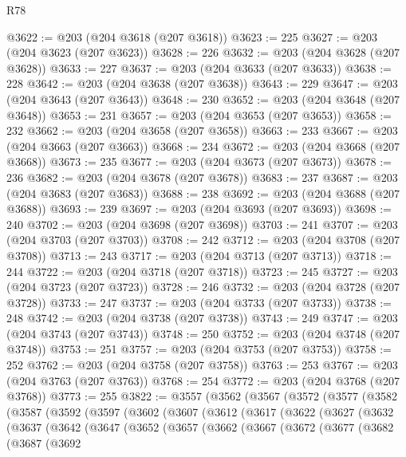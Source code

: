 \begin{lexlean}{R78}
\begin{coremodule}
@3622 := @203 (@204 @3618 (@207 @3618))
@3623 := 225
@3627 := @203 (@204 @3623 (@207 @3623))
@3628 := 226
@3632 := @203 (@204 @3628 (@207 @3628))
@3633 := 227
@3637 := @203 (@204 @3633 (@207 @3633))
@3638 := 228
@3642 := @203 (@204 @3638 (@207 @3638))
@3643 := 229
@3647 := @203 (@204 @3643 (@207 @3643))
@3648 := 230
@3652 := @203 (@204 @3648 (@207 @3648))
@3653 := 231
@3657 := @203 (@204 @3653 (@207 @3653))
@3658 := 232
@3662 := @203 (@204 @3658 (@207 @3658))
@3663 := 233
@3667 := @203 (@204 @3663 (@207 @3663))
@3668 := 234
@3672 := @203 (@204 @3668 (@207 @3668))
@3673 := 235
@3677 := @203 (@204 @3673 (@207 @3673))
@3678 := 236
@3682 := @203 (@204 @3678 (@207 @3678))
@3683 := 237
@3687 := @203 (@204 @3683 (@207 @3683))
@3688 := 238
@3692 := @203 (@204 @3688 (@207 @3688))
@3693 := 239
@3697 := @203 (@204 @3693 (@207 @3693))
@3698 := 240
@3702 := @203 (@204 @3698 (@207 @3698))
@3703 := 241
@3707 := @203 (@204 @3703 (@207 @3703))
@3708 := 242
@3712 := @203 (@204 @3708 (@207 @3708))
@3713 := 243
@3717 := @203 (@204 @3713 (@207 @3713))
@3718 := 244
@3722 := @203 (@204 @3718 (@207 @3718))
@3723 := 245
@3727 := @203 (@204 @3723 (@207 @3723))
@3728 := 246
@3732 := @203 (@204 @3728 (@207 @3728))
@3733 := 247
@3737 := @203 (@204 @3733 (@207 @3733))
@3738 := 248
@3742 := @203 (@204 @3738 (@207 @3738))
@3743 := 249
@3747 := @203 (@204 @3743 (@207 @3743))
@3748 := 250
@3752 := @203 (@204 @3748 (@207 @3748))
@3753 := 251
@3757 := @203 (@204 @3753 (@207 @3753))
@3758 := 252
@3762 := @203 (@204 @3758 (@207 @3758))
@3763 := 253
@3767 := @203 (@204 @3763 (@207 @3763))
@3768 := 254
@3772 := @203 (@204 @3768 (@207 @3768))
@3773 := 255
@3822 := @3557
    (@3562
      (@3567
        (@3572
          (@3577
            (@3582
              (@3587
                (@3592
                  (@3597
                    (@3602
                      (@3607
                        (@3612
                          (@3617
                            (@3622
                              (@3627
                                (@3632
                                  (@3637
                                    (@3642
                                      (@3647
                                        (@3652
                                          (@3657
                                            (@3662
                                              (@3667
                                                (@3672
                                                  (@3677
                                                    (@3682
                                                      (@3687
                                                        (@3692

\end{coremodule}
\end{lexlean}
